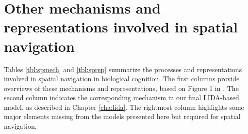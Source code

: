 
\section{Other mechanisms and representations involved in spatial navigation}


Tables \ref{tbl:spmech} and \ref{tbl:sprep} summarize the processes and representations involved in spatial navigation in biological cognition. The first columns provide overviews of these mechanisms and representations, based on Figure 1 in \citep{wolbers2010determines}. The second column indicates the corresponding mechanism in our final LIDA-based model, as described in Chapter \ref{cha:lida}. The rightmost column highlights some major elements missing from the models presented here but required for spatial navigation. 


